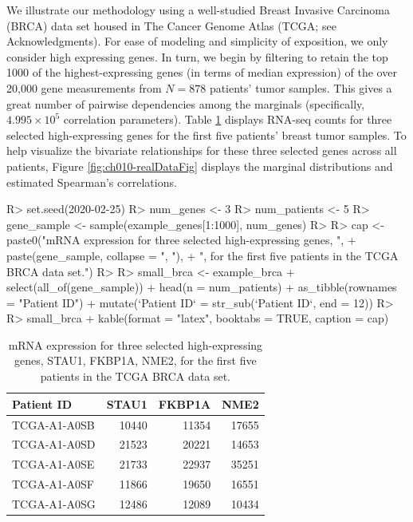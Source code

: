 \documentclass[
]{jss}
\begin{document}
We illustrate our methodology using a well-studied Breast Invasive Carcinoma (BRCA) data set housed in The Cancer Genome Atlas (TCGA; see Acknowledgments).
For ease of modeling and simplicity of exposition, we only consider high expressing genes. In turn, we begin by filtering to retain the top 1000 of the highest-expressing genes (in terms of median expression) of the over 20,000 gene measurements from \(N=878\) patients' tumor samples. This gives a great number of pairwise dependencies among the marginals (specifically, \(\ensuremath{4.995\times 10^{5}}\) correlation parameters). Table \ref{tab:ch010-realDataTab} displays RNA-seq counts for three selected high-expressing genes for the first five patients' breast tumor samples. To help visualize the bivariate relationships for these three selected genes across all patients, Figure \ref{fig:ch010-realDataFig} displays the marginal distributions and estimated Spearman's correlations.

\begin{CodeChunk}
\begin{CodeInput}
R> set.seed(2020-02-25)
R> num_genes    <- 3
R> num_patients <- 5
R> gene_sample  <- sample(example_genes[1:1000], num_genes)
R> 
R> cap <- paste0("mRNA expression for three selected high-expressing genes, ",
+               paste(gene_sample, collapse = ", "), 
+               ", for the first five patients in the TCGA BRCA data set.")
R> 
R> small_brca <- example_brca %
+   select(all_of(gene_sample)) %
+   head(n = num_patients) %
+   as_tibble(rownames = "Patient ID") %
+   mutate(`Patient ID` = str_sub(`Patient ID`, end = 12))
R> 
R> small_brca %
+   kable(format = "latex", booktabs = TRUE, caption = cap)
\end{CodeInput}
\begin{table}

\caption{\label{tab:ch010-realDataTab}mRNA expression for three selected high-expressing genes, STAU1, FKBP1A, NME2, for the first five patients in the TCGA BRCA data set.}
\centering
\begin{tabular}[t]{lrrr}
\toprule
Patient ID & STAU1 & FKBP1A & NME2\\
\midrule
TCGA-A1-A0SB & 10440 & 11354 & 17655\\
TCGA-A1-A0SD & 21523 & 20221 & 14653\\
TCGA-A1-A0SE & 21733 & 22937 & 35251\\
TCGA-A1-A0SF & 11866 & 19650 & 16551\\
TCGA-A1-A0SG & 12486 & 12089 & 10434\\
\bottomrule
\end{tabular}
\end{table}

\end{CodeChunk}
\end{document}
